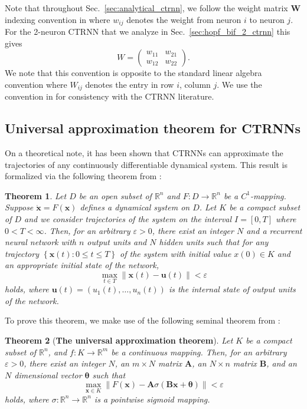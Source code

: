 \documentclass[11pt, letterpaper]{article}
\newtheorem{theorem}{Theorem}[section]
\begin{document}
Note that throughout Sec.~\ref{sec:analytical_ctrnn}, we follow the weight matrix $\mathbf{W}$ indexing convention in \citet{beer1995dynamics} where $w_{ij}$ denotes the weight from neuron $i$ to neuron $j$. For the 2-neuron CTRNN that we analyze in Sec.~\ref{sec:hopf_bif_2_ctrnn} this gives
\[
W = \begin{pmatrix} w_{11} & w_{21} \\ w_{12} & w_{22} \end{pmatrix}.
\]
We note that this convention is opposite to the standard linear algebra convention where $W_{ij}$ denotes the entry in row $i$, column $j$. We use the convention in \citet{beer1995dynamics} for consistency with the CTRNN literature.

\subsection{Universal approximation theorem for CTRNNs}

On a theoretical note, it has been shown that CTRNNs can approximate the trajectories of any continuously differentiable dynamical system. This result is formalized via the following theorem from \citet{funahashi1993approximation}:

\begin{theorem}\label{thm:ctrnn_approx}
    Let $D$ be an open subset of $\mathbb{R}^n$ and $F:D\to\mathbb{R}^n$ be a $C^1$-mapping. Suppose $\dot{\mathbf{x}}=F(\mathbf{x})$ defines a dynamical system on $D$. Let $K$ be a compact subset of $D$ and we consider trajectories of the system on the interval $I=\left[0,T\right]$ where $0<T<\infty$. Then, for an arbitrary $\varepsilon>0$, there exist an integer $N$ and a recurrent neural network with $n$ output units and $N$ hidden units such that for any trajectory $\left\{ \mathbf{x}(t):0\leq t\leq T \right\}$ of the system with initial value $x(0)\in K$ and an appropriate initial state of the network, \[ \max_{t\in T} \| \mathbf{x}(t)-\mathbf{u}(t) \| < \varepsilon \] holds, where $\mathbf{u}(t)=(u_1(t),\ldots,u_n(t))$ is the internal state of output units of the network.
\end{theorem}

To prove this theorem, we make use of the following seminal theorem from \citet{cybenko1989approximation}:

\begin{theorem}[\textbf{The universal approximation theorem}]
    \label{thm:fund_approx_thm}
    Let $K$ be a compact subset of $\mathbb{R}^n$, and $f:K\to\mathbb{R}^m$ be a continuous mapping. Then, for an arbitrary $\varepsilon>0$, there exist an integer $N$, an $m\times N$ matrix $\mathbf{A}$, an $N\times n$ matrix $\mathbf{B}$, and an $N$ dimensional vector $\mathbf{\theta}$ such that \[ \max_{\mathbf{x}\in K}\|F(\mathbf{x})-\mathbf{A}\sigma(\mathbf{B}\mathbf{x}+\mathbf{\theta}) \| < \varepsilon \] holds, where $\sigma:\mathbb{R}^n\to\mathbb{R}^n$ is a pointwise sigmoid mapping.
\end{theorem}
\end{document}
